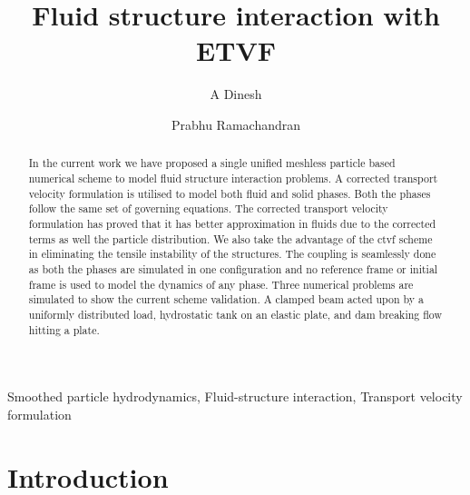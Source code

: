 \documentclass[preprint,12pt]{elsarticle}
\begin{document}
\begin{frontmatter}

  \title{Fluid structure interaction with ETVF}
  \author[IITB]{A Dinesh}
  \author[IITB]{Prabhu Ramachandran}
  \address[IITB]{Department of Aerospace Engineering, Indian Institute of
    Technology Bombay, Powai, Mumbai 400076}


\begin{abstract}
In the current work we have proposed a single
unified meshless particle based numerical scheme to model fluid structure
interaction problems. A corrected transport velocity formulation is utilised to
model both fluid and solid phases. Both the phases follow the same set of
governing equations. The corrected transport velocity formulation has proved
that it has better approximation in fluids due to the corrected terms as well
the particle distribution. We also take the advantage of the ctvf scheme in
eliminating the tensile instability of the structures. The coupling is
seamlessly done as both the phases are simulated in one configuration and no
reference frame or initial frame is used to model the dynamics of any phase.
Three numerical problems are simulated to show the current scheme validation. A
clamped beam acted upon by a uniformly distributed load, hydrostatic tank on an
elastic plate, and dam breaking flow hitting a plate.
\end{abstract}

\begin{keyword}
{Smoothed particle hydrodynamics}, {Fluid-structure interaction}, {Transport velocity formulation}


\end{keyword}

\end{frontmatter}


\section{Introduction}
\label{sec:intro}
\end{document}
